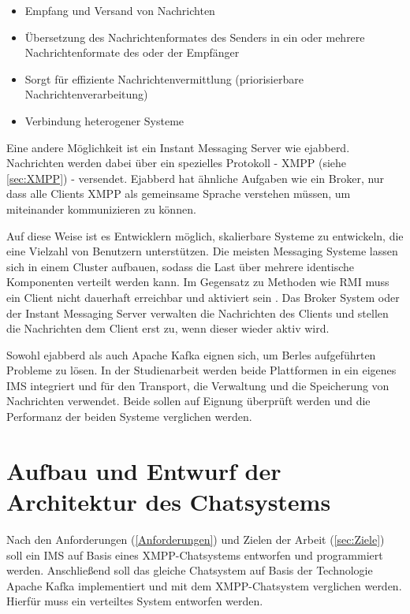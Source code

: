 \documentclass[a4paper,titlepage,halfparskip,12pt]{scrreprt}
\begin{document}
\begin{onehalfspacing}
\begin{itemize}
\item Empfang und Versand von Nachrichten
\item Übersetzung des Nachrichtenformates des Senders in ein oder mehrere Nachrichtenformate des oder der Empfänger
\item Sorgt für effiziente Nachrichtenvermittlung (priorisierbare Nachrichtenverarbeitung)
\item Verbindung heterogener Systeme
\end{itemize}

Eine andere Möglichkeit ist ein Instant Messaging Server wie ejabberd. Nachrichten werden dabei über ein spezielles Protokoll - \ac{XMPP} (siehe \autoref{sec:XMPP}) - versendet. Ejabberd hat ähnliche Aufgaben wie ein Broker, nur dass alle Clients \acs{XMPP} als gemeinsame Sprache verstehen müssen, um miteinander kommunizieren zu können.

Auf diese Weise ist es Entwicklern möglich, skalierbare Systeme zu entwickeln, die eine Vielzahl von Benutzern unterstützen. Die meisten Messaging Systeme lassen sich in einem Cluster aufbauen, sodass die Last über mehrere identische Komponenten verteilt werden kann. Im Gegensatz zu Methoden wie \ac{RMI} muss ein Client nicht dauerhaft erreichbar und aktiviert sein \cite{andrew2008verteilte}. Das Broker System oder der Instant Messaging Server verwalten die Nachrichten des Clients und stellen die Nachrichten dem Client erst zu, wenn dieser wieder aktiv wird.

Sowohl ejabberd als auch Apache Kafka eignen sich, um Berles aufgeführten Probleme zu lösen. In der Studienarbeit werden beide Plattformen in ein eigenes \ac{IMS} integriert und für den Transport, die Verwaltung und die Speicherung von Nachrichten verwendet. Beide sollen auf Eignung überprüft werden und die Performanz der beiden Systeme verglichen werden.

\pagebreak


\chapter{Aufbau und Entwurf der Architektur des Chatsystems}
\label{chap:Architektur}

Nach den Anforderungen (\autoref{Anforderungen}) und Zielen der Arbeit (\autoref{sec:Ziele}) soll ein \ac{IMS} auf Basis eines \ac{XMPP}-Chatsystems entworfen und programmiert werden. Anschließend soll das gleiche Chatsystem auf Basis der Technologie Apache Kafka implementiert und mit dem \ac{XMPP}-Chatsystem verglichen werden. Hierfür muss ein verteiltes System entworfen werden.


\end{onehalfspacing}
\end{document}
